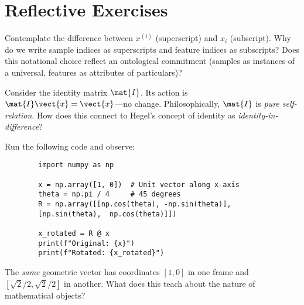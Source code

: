 \section{Reflective Exercises}

\begin{exercise}
	Contemplate the difference between $x^{(i)}$ (superscript) and $x_i$ (subscript). Why do we write sample indices as superscripts and feature indices as subscripts? Does this notational choice reflect an ontological commitment (samples as instances of a universal, features as attributes of particulars)?
\end{exercise}

\begin{exercise}
	Consider the identity matrix $\mat{I}$. Its action is $\mat{I}\vect{x} = \vect{x}$---no change. Philosophically, $\mat{I}$ is \textit{pure self-relation}. How does this connect to Hegel's concept of identity as \textit{identity-in-difference}?
\end{exercise}

\begin{exercise}
	Run the following code and observe:
	\begin{lstlisting}
		import numpy as np
		
		x = np.array([1, 0])  # Unit vector along x-axis
		theta = np.pi / 4     # 45 degrees
		R = np.array([[np.cos(theta), -np.sin(theta)],
		[np.sin(theta),  np.cos(theta)]])
		
		x_rotated = R @ x
		print(f"Original: {x}")
		print(f"Rotated: {x_rotated}")
	\end{lstlisting}
	
	The \textit{same} geometric vector has coordinates $[1, 0]$ in one frame and $[\sqrt{2}/2, \sqrt{2}/2]$ in another. What does this teach about the nature of mathematical objects?
\end{exercise}
